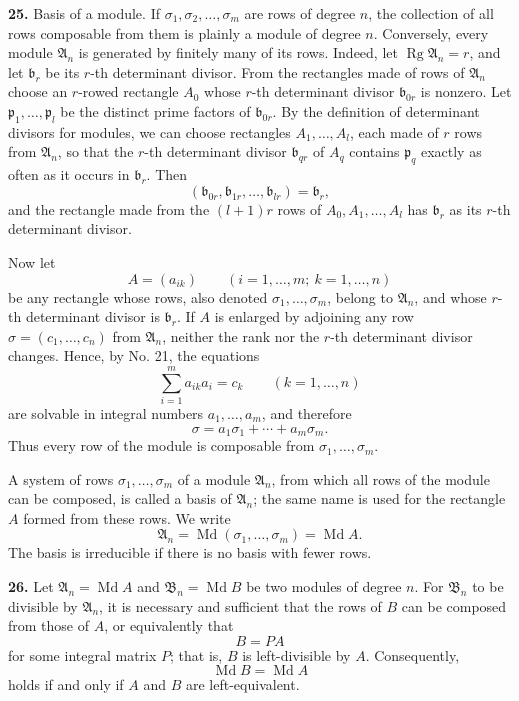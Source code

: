 \documentclass[11pt,a4paper]{article}
\begin{document}
\textbf{25.} Basis of a module. If \(\sigma_1,\sigma_2,\ldots,\sigma_m\) are rows of degree \(n\), the collection of all rows composable from them is plainly a module of degree \(n\). Conversely, every module \(\mathfrak A_n\) is generated by finitely many of its rows. Indeed, let \(\operatorname{Rg}\mathfrak A_n=r\), and let \(\mathfrak b_r\) be its \(r\)-th determinant divisor. From the rectangles made of rows of \(\mathfrak A_n\) choose an \(r\)-rowed rectangle \(A_0\) whose \(r\)-th determinant divisor \(\mathfrak b_{0r}\) is nonzero. Let \(\mathfrak p_1,\ldots,\mathfrak p_l\) be the distinct prime factors of \(\mathfrak b_{0r}\). By the definition of determinant divisors for modules, we can choose rectangles \(A_1,\ldots,A_l\), each made of \(r\) rows from \(\mathfrak A_n\), so that the \(r\)-th determinant divisor \(\mathfrak b_{qr}\) of \(A_q\) contains \(\mathfrak p_q\) exactly as often as it occurs in \(\mathfrak b_r\). Then
\[
 (\mathfrak b_{0r},\mathfrak b_{1r},\ldots,\mathfrak b_{lr})=\mathfrak b_r,
\]
and the rectangle made from the \((l+1)r\) rows of \(A_0,A_1,\ldots,A_l\) has \(\mathfrak b_r\) as its \(r\)-th determinant divisor.

Now let
\[
 A=(a_{ik})\qquad(i=1,\ldots,m;\ k=1,\ldots,n)
\]
be any rectangle whose rows, also denoted \(\sigma_1,\ldots,\sigma_m\), belong to \(\mathfrak A_n\), and whose \(r\)-th determinant divisor is \(\mathfrak b_r\). If \(A\) is enlarged by adjoining any row \(\sigma=(c_1,\ldots,c_n)\) from \(\mathfrak A_n\), neither the rank nor the \(r\)-th determinant divisor changes. Hence, by No. 21, the equations
\[
 \sum_{i=1}^{m}a_{ik}a_i=c_k\qquad(k=1,\ldots,n)
\]
are solvable in integral numbers \(a_1,\ldots,a_m\), and therefore
\[
 \sigma=a_1\sigma_1+\cdots+a_m\sigma_m.
\]
Thus every row of the module is composable from \(\sigma_1,\ldots,\sigma_m\).

A system of rows \(\sigma_1,\ldots,\sigma_m\) of a module \(\mathfrak A_n\), from which all rows of the module can be composed, is called a basis of \(\mathfrak A_n\); the same name is used for the rectangle \(A\) formed from these rows. We write
\[
 \mathfrak A_n=\operatorname{Md}(\sigma_1,\ldots,\sigma_m)=\operatorname{Md} A.
\]
The basis is irreducible if there is no basis with fewer rows.

\textbf{26.} Let \(\mathfrak A_n=\operatorname{Md}A\) and \(\mathfrak B_n=\operatorname{Md}B\) be two modules of degree \(n\). For \(\mathfrak B_n\) to be divisible by \(\mathfrak A_n\), it is necessary and sufficient that the rows of \(B\) can be composed from those of \(A\), or equivalently that
\[
 B=PA
\]
for some integral matrix \(P\); that is, \(B\) is left-divisible by \(A\). Consequently,
\[
 \operatorname{Md}B=\operatorname{Md}A
\]
holds if and only if \(A\) and \(B\) are left-equivalent.
\end{document}
